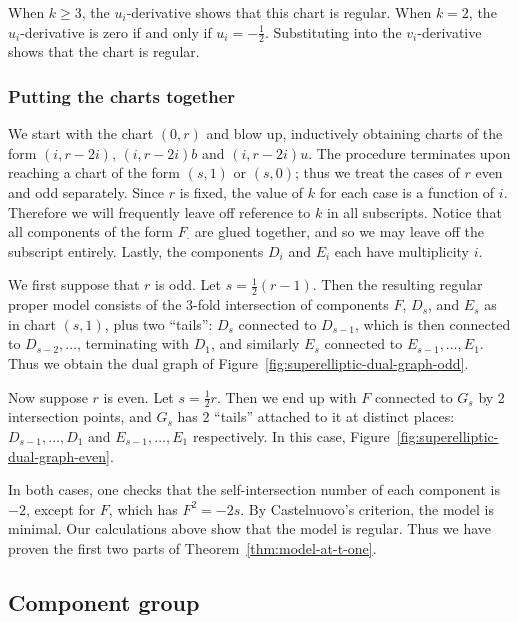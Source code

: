 \documentclass[reqno]{amsart}
\theoremstyle{definition}
\theoremstyle{remark}
\begin{document}
When $k \geq 3$, the $u_i$-derivative shows that this chart is regular. When $k = 2$, the $u_i$-derivative is zero if and only if $u_i = -\frac12$. Substituting into the $v_i$-derivative shows that the chart is regular.


\subsubsection{Putting the charts together}
\label{sec:putt-charts-togeth}

We start with the chart $(0, r)$ and blow up, inductively obtaining charts of the form $(i, r-2i)$, $(i, r-2i)b$ and $(i, r-2i)u$. The procedure terminates upon reaching a chart of the form $(s, 1)$ or $(s, 0)$; thus we treat the cases of $r$ even and odd separately. Since $r$ is fixed, the value of $k$ for each case is a function of $i$. Therefore we will frequently leave off reference to $k$ in all subscripts. Notice that all components of the form $F_{\cdot}$ are glued together, and so we may leave off the subscript entirely. Lastly, the components $D_i$ and $E_i$ each have multiplicity $i$.

We first suppose that $r$ is odd. Let $s = \frac12(r-1)$. Then the resulting regular proper model consists of the 3-fold intersection of components $F$, $D_s$, and $E_s$ as in chart $(s, 1)$, plus two ``tails'': $D_s$ connected to $D_{s-1}$, which is then connected to $D_{s-2}, \dots$, terminating with $D_1$, and similarly $E_s$ connected to $E_{s-1}, \dots, E_1$. Thus we obtain the dual graph of Figure~\ref{fig:superelliptic-dual-graph-odd}.

Now suppose $r$ is even. Let $s = \frac12 r$. Then we end up with $F$ connected to $G_s$ by 2 intersection points, and $G_s$ has 2 ``tails'' attached to it at distinct places: $D_{s-1}, \dots, D_1$ and $E_{s-1}, \dots, E_1$ respectively. In this case, Figure~\ref{fig:superelliptic-dual-graph-even}.

In both cases, one checks that the self-intersection number of each component is $-2$, except for $F$, which has $F^2 = -2s$. By Castelnuovo's criterion, the model is minimal. Our calculations above show that the model is regular. Thus we have proven the first two parts of Theorem~\ref{thm:model-at-t-one}.

\subsection{Component group}
\label{sec:component-group-t-equals-one}
\end{document}
